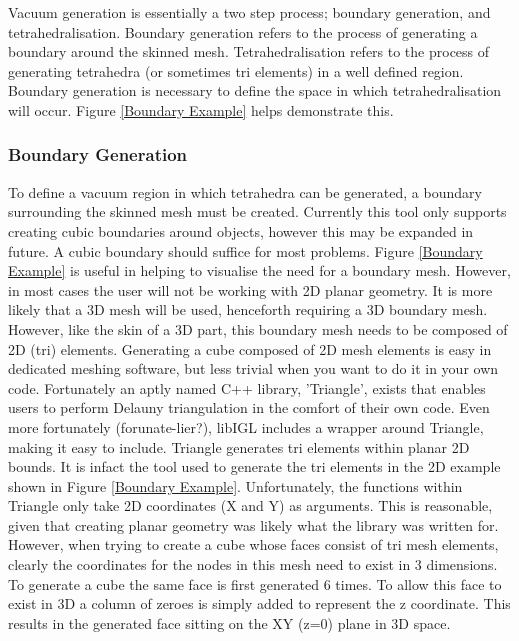 \documentclass[12pt, letterpaper]{article}
\begin{document}
Vacuum generation is essentially a two step process; boundary generation, and tetrahedralisation. Boundary generation refers to the process of generating a boundary around the skinned mesh. Tetrahedralisation refers to the process of generating tetrahedra (or sometimes tri elements) in a well defined region. Boundary generation is necessary to define the space in which tetrahedralisation will occur. Figure \ref{Boundary Example} helps demonstrate this.

\subsubsection{Boundary Generation} \label{BoundaryGeneration}
To define a vacuum region in which tetrahedra can be generated, a boundary surrounding the skinned mesh must be created. Currently this tool only supports creating cubic boundaries around objects, however this may be expanded in future. A cubic boundary should suffice for most problems. Figure \ref{Boundary Example} is useful in helping to visualise the need for a boundary mesh. However, in most cases the user will not be working with 2D planar geometry. It is more likely that a 3D mesh will be used, henceforth requiring a 3D boundary mesh. However, like the skin of a 3D part, this boundary mesh needs to be composed of 2D (tri) elements. Generating a cube composed of 2D mesh elements is easy in dedicated meshing software, but less trivial when you want to do it in your own code. Fortunately an aptly named C++ library, 'Triangle', exists that enables users to perform Delauny triangulation in the comfort of their own code. Even more fortunately (forunate-lier?), libIGL includes a wrapper around Triangle, making it easy to include. Triangle generates tri elements within planar 2D bounds. It is infact the tool used to generate the tri elements in the 2D example shown in Figure \ref{Boundary Example}.  Unfortunately, the functions within Triangle only take 2D coordinates (X and Y) as arguments. This is reasonable, given that creating planar geometry was likely what the library was written for. However, when trying to create a cube whose faces consist of tri mesh elements, clearly the coordinates for the nodes in this mesh need to exist in 3 dimensions. To generate a cube the same face is first generated 6 times. To allow this face to exist in 3D a column of zeroes is simply added to represent the z coordinate. This results in the generated face sitting on the XY (z=0) plane in 3D space.
\end{document}
